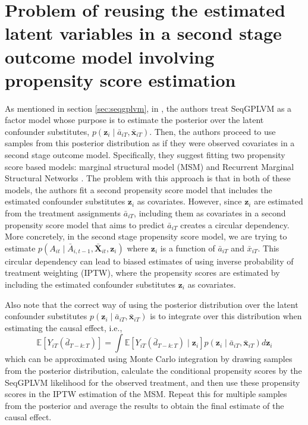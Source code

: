 \section{Problem of reusing the estimated latent variables in a second stage outcome model involving propensity score estimation}
\label{sec:hatt-problems}
As mentioned in section \ref{sec:seqgplvm}, in \cite{hattSequentialDeconfoundingCausal2024}, the authors treat 
SeqGPLVM as a factor model whose purpose is to estimate the posterior over the latent confounder substitutes, 
\(p(\mathbf{z}_i \mid \bar{a}_{iT}, \bar{\mathbf{x}}_{iT})\). Then, the authors proceed to use samples 
from this posterior distribution as if they were observed covariates in a second stage outcome model. 
Specifically, they suggest fitting two propensity score based models: 
marginal structural model (MSM)\cite{robinsEstimationCausalEffects2008} and 
Recurrent Marginal Structural Networks \cite{limForecastingTreatmentResponses2018}. The 
problem with this approach is that in both of these models, the authors fit a second propensity score model 
that includes the estimated confounder substitutes \(\mathbf{z}_i\) as covariates. However, since \(\mathbf{z}_i\) 
are estimated from the treatment assignments \(\bar{a}_{iT}\), including them as covariates in a second propensity score 
model that aims to predict \(\bar{a}_{iT}\) creates a circular dependency. More concretely, 
in the second stage propensity score model, we are trying to estimate 
\(p(A_{it} \mid \bar{A}_{i,t-1}, \bar{\mathbf{X}}_{it}, \mathbf{z}_i)\) where \(\mathbf{z}_i\) is a function of 
\(\bar{a}_{iT}\) and \(\bar{x}_{iT}\). 
This circular dependency can lead to biased estimates of
using inverse probability of treatment weighting (IPTW), where the propensity scores are estimated by including the estimated confounder substitutes $\mathbf{z}_i$ as covariates.

Also note that the correct way of using the posterior distribution over 
the latent confounder substitutes \(p(\mathbf{z}_i \mid \bar{a}_{iT}, \bar{\mathbf{x}}_{iT})\)
is to integrate over this distribution when estimating the causal effect, i.e.,
\begin{equation}
    \mathbb{E}\left[Y_{iT}(\bar{d}_{T-k:T})\right] = \int \mathbb{E}\left[Y_{iT}(\bar{d}_{T-k:T}) \mid \mathbf{z}_i\right] p(\mathbf{z}_i \mid \bar{a}_{iT}, \bar{\mathbf{x}}_{iT}) d\mathbf{z}_i
\end{equation}
which can be approximated using Monte Carlo integration by drawing samples from the posterior distribution, 
calculate the conditional propensity scores by the SeqGPLVM likelihood for the 
observed treatment, and then use these propensity scores in the IPTW estimation of the MSM.
Repeat this for multiple samples from the posterior and average the results to obtain the final estimate of the causal effect. 

